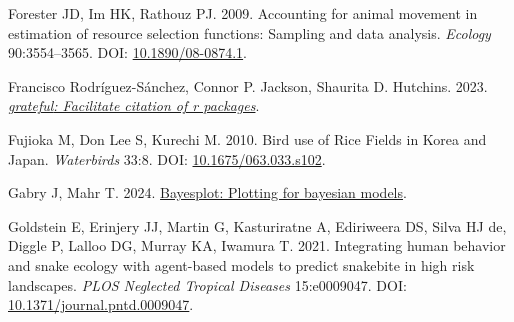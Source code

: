\documentclass[10pt,a4paper]{article}
\newlength{\cslhangindent}
\newenvironment{CSLReferences}[2] %
 {\begin{list}{}{%
  \setlength{\itemindent}{0pt}
  \setlength{\leftmargin}{0pt}
  \setlength{\parsep}{0pt}
  \ifodd #1
   \setlength{\leftmargin}{\cslhangindent}
   \setlength{\itemindent}{-1\cslhangindent}
  \fi
  \setlength{\itemsep}{#2\baselineskip}}}
 {\end{list}}
\begin{document}
\begin{CSLReferences}{1}{0}
Forester JD, Im HK, Rathouz PJ. 2009. Accounting for animal movement in estimation of resource selection functions: Sampling and data analysis. \emph{Ecology} 90:3554--3565. DOI: \href{https://doi.org/10.1890/08-0874.1}{10.1890/08-0874.1}.

Francisco Rodríguez-Sánchez, Connor P. Jackson, Shaurita D. Hutchins. 2023. \emph{\href{https://github.com/Pakillo/grateful}{{grateful}: Facilitate citation of r packages}}.

Fujioka M, Don Lee S, Kurechi M. 2010. Bird use of {Rice} {Fields} in {Korea} and {Japan}. \emph{Waterbirds} 33:8. DOI: \href{https://doi.org/10.1675/063.033.s102}{10.1675/063.033.s102}.

Gabry J, Mahr T. 2024. \href{https://mc-stan.org/bayesplot/}{Bayesplot: Plotting for bayesian models}.

Goldstein E, Erinjery JJ, Martin G, Kasturiratne A, Ediriweera DS, Silva HJ de, Diggle P, Lalloo DG, Murray KA, Iwamura T. 2021. Integrating human behavior and snake ecology with agent-based models to predict snakebite in high risk landscapes. \emph{PLOS Neglected Tropical Diseases} 15:e0009047. DOI: \href{https://doi.org/10.1371/journal.pntd.0009047}{10.1371/journal.pntd.0009047}.


\end{CSLReferences}
\end{document}
